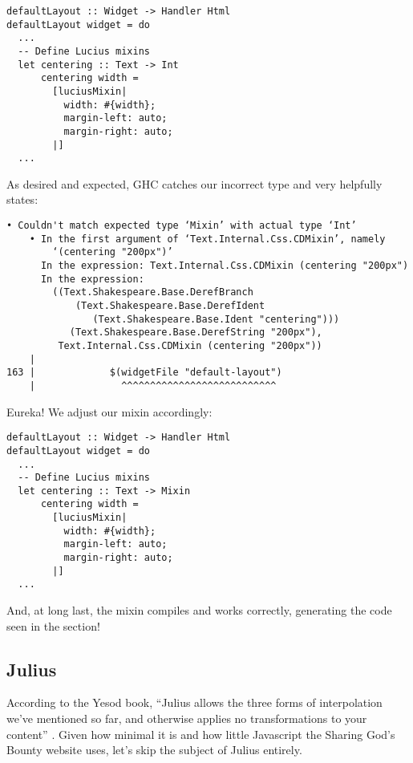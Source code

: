 \begin{Verbatim}[samepage=true]
defaultLayout :: Widget -> Handler Html
defaultLayout widget = do
  ...
  -- Define Lucius mixins
  let centering :: Text -> Int
      centering width =
        [luciusMixin|
          width: #{width};
          margin-left: auto;
          margin-right: auto;
        |]
  ...
\end{Verbatim}

As desired and expected, GHC catches our incorrect type and very helpfully states:

\begin{Verbatim}[samepage=true]
    • Couldn't match expected type ‘Mixin’ with actual type ‘Int’
    • In the first argument of ‘Text.Internal.Css.CDMixin’, namely
        ‘(centering "200px")’
      In the expression: Text.Internal.Css.CDMixin (centering "200px")
      In the expression:
        ((Text.Shakespeare.Base.DerefBranch
            (Text.Shakespeare.Base.DerefIdent
               (Text.Shakespeare.Base.Ident "centering")))
           (Text.Shakespeare.Base.DerefString "200px"), 
         Text.Internal.Css.CDMixin (centering "200px"))
    |
163 |             $(widgetFile "default-layout")
    |               ^^^^^^^^^^^^^^^^^^^^^^^^^^^
\end{Verbatim}

Eureka! We adjust our mixin accordingly:

\begin{Verbatim}[samepage=true]
defaultLayout :: Widget -> Handler Html
defaultLayout widget = do
  ...
  -- Define Lucius mixins
  let centering :: Text -> Mixin
      centering width =
        [luciusMixin|
          width: #{width};
          margin-left: auto;
          margin-right: auto;
        |]
  ...
\end{Verbatim}

And, at long last, the mixin compiles and works correctly, generating the code seen in the  section! 

\subsection{Julius}

According to the Yesod book, ``Julius allows the three forms of interpolation we’ve mentioned so far, and otherwise applies no transformations to your content'' \cite{ybkShakes}. Given how minimal it is and how little Javascript the Sharing God's Bounty website uses, let's skip the subject of Julius entirely. 
